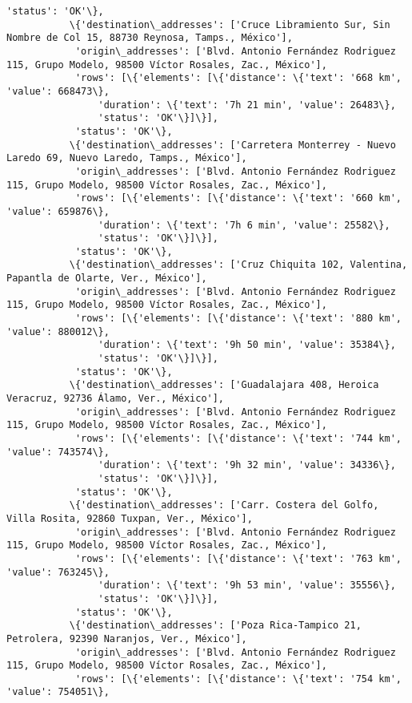 \documentclass[11pt]{article}
\begin{document}
\begin{Verbatim}[commandchars=\\\{\}]
            'status': 'OK'\},
           \{'destination\_addresses': ['Cruce Libramiento Sur, Sin Nombre de Col 15, 88730 Reynosa, Tamps., México'],
            'origin\_addresses': ['Blvd. Antonio Fernández Rodriguez 115, Grupo Modelo, 98500 Víctor Rosales, Zac., México'],
            'rows': [\{'elements': [\{'distance': \{'text': '668 km', 'value': 668473\},
                'duration': \{'text': '7h 21 min', 'value': 26483\},
                'status': 'OK'\}]\}],
            'status': 'OK'\},
           \{'destination\_addresses': ['Carretera Monterrey - Nuevo Laredo 69, Nuevo Laredo, Tamps., México'],
            'origin\_addresses': ['Blvd. Antonio Fernández Rodriguez 115, Grupo Modelo, 98500 Víctor Rosales, Zac., México'],
            'rows': [\{'elements': [\{'distance': \{'text': '660 km', 'value': 659876\},
                'duration': \{'text': '7h 6 min', 'value': 25582\},
                'status': 'OK'\}]\}],
            'status': 'OK'\},
           \{'destination\_addresses': ['Cruz Chiquita 102, Valentina, Papantla de Olarte, Ver., México'],
            'origin\_addresses': ['Blvd. Antonio Fernández Rodriguez 115, Grupo Modelo, 98500 Víctor Rosales, Zac., México'],
            'rows': [\{'elements': [\{'distance': \{'text': '880 km', 'value': 880012\},
                'duration': \{'text': '9h 50 min', 'value': 35384\},
                'status': 'OK'\}]\}],
            'status': 'OK'\},
           \{'destination\_addresses': ['Guadalajara 408, Heroica Veracruz, 92736 Álamo, Ver., México'],
            'origin\_addresses': ['Blvd. Antonio Fernández Rodriguez 115, Grupo Modelo, 98500 Víctor Rosales, Zac., México'],
            'rows': [\{'elements': [\{'distance': \{'text': '744 km', 'value': 743574\},
                'duration': \{'text': '9h 32 min', 'value': 34336\},
                'status': 'OK'\}]\}],
            'status': 'OK'\},
           \{'destination\_addresses': ['Carr. Costera del Golfo, Villa Rosita, 92860 Tuxpan, Ver., México'],
            'origin\_addresses': ['Blvd. Antonio Fernández Rodriguez 115, Grupo Modelo, 98500 Víctor Rosales, Zac., México'],
            'rows': [\{'elements': [\{'distance': \{'text': '763 km', 'value': 763245\},
                'duration': \{'text': '9h 53 min', 'value': 35556\},
                'status': 'OK'\}]\}],
            'status': 'OK'\},
           \{'destination\_addresses': ['Poza Rica-Tampico 21, Petrolera, 92390 Naranjos, Ver., México'],
            'origin\_addresses': ['Blvd. Antonio Fernández Rodriguez 115, Grupo Modelo, 98500 Víctor Rosales, Zac., México'],
            'rows': [\{'elements': [\{'distance': \{'text': '754 km', 'value': 754051\},

\end{Verbatim}
\end{document}
